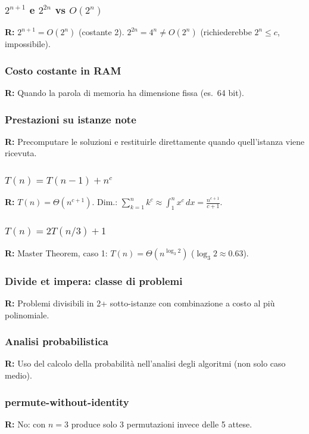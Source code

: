 \subsubsection*{\texorpdfstring{$2^{n+1}$ e $2^{2n}$ vs $O(2^n)$}%
	{2n+1 e 22n vs O(2n)}}
\textbf{R:} $2^{n+1} = O(2^n)$ (costante 2). $2^{2n} = 4^n \neq O(2^n)$
(richiederebbe $2^n \le c$, impossibile).

\subsubsection*{Costo costante in RAM}
\textbf{R:} Quando la parola di memoria ha dimensione fissa (es.\ 64 bit).

\subsubsection*{Prestazioni su istanze note}
\textbf{R:} Precomputare le soluzioni e restituirle direttamente
quando quell'istanza viene ricevuta.

\subsubsection*{\texorpdfstring{$T(n)=T(n-1)+n^c$}{T(n)=T(n-1)+nc}}
\textbf{R:} $T(n) = \Theta(n^{c+1})$.
Dim.: $\sum_{k=1}^n k^c \approx \int_1^n x^c\,dx = \frac{n^{c+1}}{c+1}$.

\subsubsection*{\texorpdfstring{$T(n)=2T(n/3)+1$}{T(n)=2T(n/3)+1}}
\textbf{R:} Master Theorem, caso 1: $T(n) = \Theta(n^{\log_3 2})$
($\log_3 2 \approx 0.63$).

\subsubsection*{Divide et impera: classe di problemi}
\textbf{R:} Problemi divisibili in 2+ sotto-istanze con combinazione
a costo al più polinomiale.

\subsubsection*{Analisi probabilistica}
\textbf{R:} Uso del calcolo della probabilità nell'analisi degli algoritmi
(non solo caso medio).

\subsubsection*{permute-without-identity}
\textbf{R:} No: con $n=3$ produce solo 3 permutazioni invece delle 5 attese.

